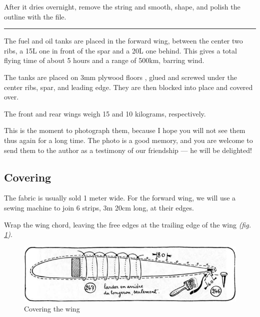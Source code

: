 \documentclass{book}
\newcommand*\circled[1]{\tikz[baseline=(char.base)]{
    \node[shape=circle,draw,inner sep=1pt] (char) {#1};}}
\newcommand*\sectline{
  \vspace{5pt}
  \begin{center}
    \rule{0.5\linewidth}{\linethickness}
  \end{center}
  \vspace{5pt}
}
\begin{document}
After it dries overnight, remove the string and smooth, shape, and
polish the outline with the file.

\sectline

The fuel and oil tanks are placed in the forward wing, between the
center two ribs, a 15L one in front of the spar and a 20L one behind.
This gives a total flying time of about 5 hours and a range of 500km,
barring wind.

The tanks are placed on 3mm plywood floors \circled{245}, glued and
screwed under the center ribs, spar, and leading edge.  They are then
blocked into place and covered over.

The front and rear wings weigh 15 and 10 kilograms, respectively.

This is the moment to photograph them, because I hope you will not see
them thus again for a long time.  The photo is a good memory, and you
are welcome to send them to the author as a testimony of our
friendship --- he will be delighted!

\subsection{Covering}

The fabric is usually sold 1 meter wide.  For the forward wing, we
will use a sewing machine to join 6 strips, 3m 20cm long, at their
edges.

Wrap the wing chord, leaving the free edges at the trailing edge of
the wing \textit{(fig. \ref{fig:fortyeight})}.

\begin{figure}
  \includegraphics[width=\linewidth]{fig-48.jpg}
  \caption{Covering the wing}
  \label{fig:fortyeight}
\end{figure}
\end{document}
